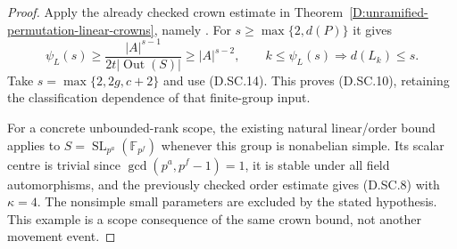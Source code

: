 \begin{proof}
Apply the already checked crown estimate in
Theorem~\ref{D:unramified-permutation-linear-crowns},
namely \citet[Proposition 2.6, equations (2.1)--(2.2),
pp.~12--13]{LucchiniMarionTracey2020D}. For
$s\geq\max\{2,d(P)\}$ it gives
\[
 \psi_L(s)\geq\frac{|A|^{s-1}}{2t|\operatorname{Out}(S)|}
                  \geq |A|^{s-2},
 \qquad k\leq\psi_L(s)\Longrightarrow d(L_k)\leq s.
\]
Take $s=\max\{2,2g,c+2\}$ and use (D.SC.14).
This proves (D.SC.10), retaining the classification
dependence of that finite-group input.

For a concrete unbounded-rank scope, the existing natural
linear/order bound applies to
$S=\operatorname{SL}_{p^a}(\mathbb F_{p^f})$ whenever
this group is nonabelian simple. Its scalar centre is
trivial since $\gcd(p^a,p^f-1)=1$, it is stable under
all field automorphisms, and the previously checked
order estimate gives (D.SC.8) with $\kappa=4$.
The nonsimple small parameters are excluded by the
stated hypothesis. This example is a scope consequence
of the same crown bound, not another movement event.
\end{proof}
